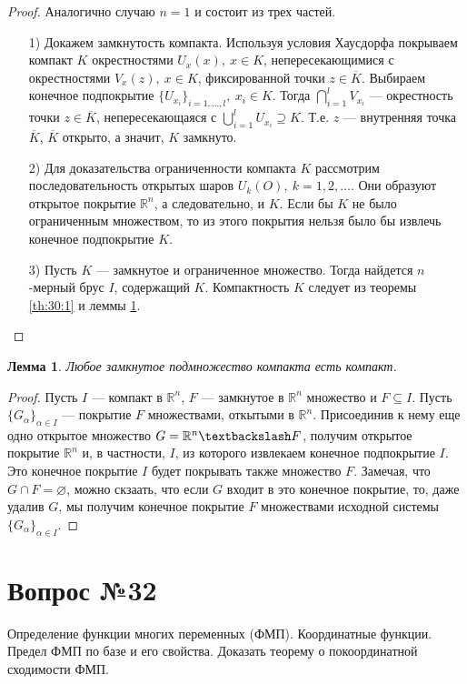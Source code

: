 \documentclass[12pt]{report}
\numberwithin{equation}{section}
\newtheorem{lemma}{Лемма}[section]
\begin{document}
\begin{proof}
Аналогично случаю $n = 1$ и состоит из трех частей.
\begin{enumerate}

\item[1)] Докажем замкнутость компакта. Используя условия Хаусдорфа покрываем компакт $K$ окрестностями $U_x(x),~x \in K$, непересекающимися с окрестностями $V_x(z),~x \in K$, фиксированной точки $z \in \overline{K}$. Выбираем конечное подпокрытие $\{ U_{x_i}\}_{i = 1, \ldots, l},~x_i \in K$. Тогда $\bigcap\limits_{i = 1}^l V_{x_i}$ --- окрестность точки $z \in \overline{K}$, непересекающаяся с $\bigcup\limits_{i  = 1}^l U_{x_i} \supseteq K$. Т.е. $z$ --- внутренняя точка $\overline{K}$, $\overline{K}$ открыто, а значит, $K$ замкнуто.
\item[2)] Для доказательства ограниченности компакта $K$ рассмотрим последовательность открытых шаров $U_k(O),~k=1,2,\ldots$. Они образуют открытое покрытие $\mathbb{R}^n$, а следовательно, и $K$. Если бы $K$ не было ограниченным множеством, то из этого покрытия нельзя было бы извлечь конечное подпокрытие $K$.
\item[3)] Пусть $K$ --- замкнутое и ограниченное множество. Тогда найдется $n$-мерный брус $I$, содержащий $K$. Компактность $K$ следует из теоремы \ref{th:30:1} и леммы \ref{lemm:31:1}.
\end{enumerate}
\end{proof}

\begin{lemma} \label{lemm:31:1}
Любое замкнутое подмножество компакта есть компакт.
\end{lemma}
\begin{proof}
Пусть $I$ --- компакт в $\mathbb{R}^n$, $F$ --- замкнутое в $\mathbb{R}^n$ множество и $F \subseteq I$. Пусть $\{ G_{\alpha} \}_{\alpha \in I}$ --- покрытие $F$ множествами, откытыми в $\mathbb{R}^n$. Присоединив к нему еще одно открытое множество $G = \mathbb{R}^n \textbackslash F$, получим открытое покрытие $\mathbb{R}^n$ и, в частности, $I$, из которого извлекаем конечное подпокрытие $I$. Это конечное покрытие $I$ будет покрывать также множество $F$. Замечая, что $G \cap F = \varnothing$, можно скзаать, что если $G$ входит в это конечное покрытие, то, даже удалив $G$, мы получим конечное покрытие $F$ множествами исходной системы $\{ G_{\alpha}\}_{\alpha \in I}$.
\end{proof}

\newpage \section{Вопрос №32} %
\begin{framed}
Определение функции многих переменных (ФМП). Координатные функции. Предел ФМП по базе и его свойства. Доказать теорему о покоординатной сходимости ФМП.
\end{framed}
\end{document}
